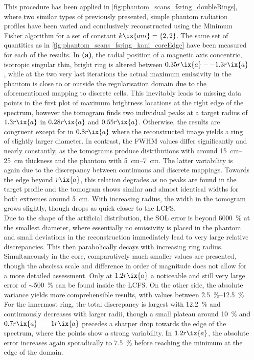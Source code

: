 %
                This procedure has been applied in \cref{fig:phantom_scans_fsring_doubleRings}, where two similar types of previously presented, simple phantom radiation profiles have been varied and conclusively reconstructed using the Minimum Fisher algorithm for a set of constant $k\ix{ani}=\left\{2, 2\right\}$. The same set of quantities as in \cref{fig:phantom_scans_fsring_kani_coreEdge} have been measured for each of the results. In \textbf{(a)}, the radial position of a magnetic axis concentric, isotropic singular thin, bright ring is altered between $0.35r\ix{a}--1.3r\ix{a}$, while at the two very last iterations the actual maximum emissivity in the phantom is close to or outside the regularisation domain due to the aforementioned mapping to discrete cells. This inevitably leads to missing data points in the first plot of maximum brightness locations at the right edge of the spectrum, however the tomogram finds two individual peaks at a target radius of $1.3r\ix{a}$ in $0.28r\ix{a}$ and $0.55r\ix{a}$. Otherwise, the results are congruent except for in $0.8r\ix{a}$ where the reconstructed image yields a ring of slightly larger diameter. In contrast, the FWHM values differ significantly and nearly constantly, as the tomograms produce distributions with around \SIrange{15}{25}{\centi\meter} thickness and the phantom with \SIrange{5}{7}{\centi\meter}. The latter variability is again due to the discrepancy between continuous and discrete mappings. Towards the edge beyond $r\ix{a}$, this relation degrades as no peaks are found in the target profile and the tomogram shows similar and almost identical widths for both extremes around \SI{5}{\centi\meter}. With increasing radius, the width in the tomogram grows slightly, though drops as quick closer to the LCFS.\\%
                Due to the shape of the artificial distribution, the SOL error is beyond \SI{6000}{\percent} at the smallest diameter, where essentially no emissivity is placed in the phantom and small deviations in the reconstruction immediately lead to very large relative discrepancies. This then parabolically decays with increasing ring radius. Simultaneously in the core, comparatively much smaller values are presented, though the abscissa scale and difference in order of magnitude does not allow for a more detailed assessment. Only at $1.2r\ix{a}$ a noticeable and still very large error of $\sim$\SI{500}{\percent} can be found inside the LCFS. On the other side, the absolute variance yields more comprehensible results, with values between \SIrange{2.5}{12.5}{\percent}. For the innermost ring, the total discrepancy is largest with \SI{12.2}{\percent} and continuously decreases with larger radii, though a small plateau around \SI{10}{\percent} and $0.7r\ix{a}--1r\ix{a}$ precedes a sharper drop towards the edge of the spectrum, where the points show a strong variability. In $1.2r\ix{a}$, the absolute error increases again sporadically to \SI{7.5}{\percent} before reaching the minimum at the edge of the domain.\\%

